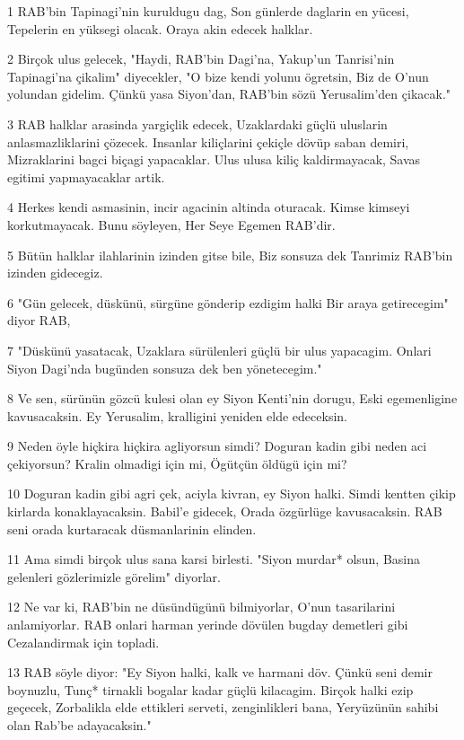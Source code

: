 \par 1 RAB'bin Tapinagi'nin kuruldugu dag, Son günlerde daglarin en yücesi, Tepelerin en yüksegi olacak. Oraya akin edecek halklar.
\par 2 Birçok ulus gelecek, "Haydi, RAB'bin Dagi'na, Yakup'un Tanrisi'nin Tapinagi'na çikalim" diyecekler, "O bize kendi yolunu ögretsin, Biz de O'nun yolundan gidelim. Çünkü yasa Siyon'dan, RAB'bin sözü Yerusalim'den çikacak."
\par 3 RAB halklar arasinda yargiçlik edecek, Uzaklardaki güçlü uluslarin anlasmazliklarini çözecek. Insanlar kiliçlarini çekiçle dövüp saban demiri, Mizraklarini bagci biçagi yapacaklar. Ulus ulusa kiliç kaldirmayacak, Savas egitimi yapmayacaklar artik.
\par 4 Herkes kendi asmasinin, incir agacinin altinda oturacak. Kimse kimseyi korkutmayacak. Bunu söyleyen, Her Seye Egemen RAB'dir.
\par 5 Bütün halklar ilahlarinin izinden gitse bile, Biz sonsuza dek Tanrimiz RAB'bin izinden gidecegiz.
\par 6 "Gün gelecek, düskünü, sürgüne gönderip ezdigim halki Bir araya getirecegim" diyor RAB,
\par 7 "Düskünü yasatacak, Uzaklara sürülenleri güçlü bir ulus yapacagim. Onlari Siyon Dagi'nda bugünden sonsuza dek ben yönetecegim."
\par 8 Ve sen, sürünün gözcü kulesi olan ey Siyon Kenti'nin dorugu, Eski egemenligine kavusacaksin. Ey Yerusalim, kralligini yeniden elde edeceksin.
\par 9 Neden öyle hiçkira hiçkira agliyorsun simdi? Doguran kadin gibi neden aci çekiyorsun? Kralin olmadigi için mi, Ögütçün öldügü için mi?
\par 10 Doguran kadin gibi agri çek, aciyla kivran, ey Siyon halki. Simdi kentten çikip kirlarda konaklayacaksin. Babil'e gidecek, Orada özgürlüge kavusacaksin. RAB seni orada kurtaracak düsmanlarinin elinden.
\par 11 Ama simdi birçok ulus sana karsi birlesti. "Siyon murdar* olsun, Basina gelenleri gözlerimizle görelim" diyorlar.
\par 12 Ne var ki, RAB'bin ne düsündügünü bilmiyorlar, O'nun tasarilarini anlamiyorlar. RAB onlari harman yerinde dövülen bugday demetleri gibi Cezalandirmak için topladi.
\par 13 RAB söyle diyor: "Ey Siyon halki, kalk ve harmani döv. Çünkü seni demir boynuzlu, Tunç* tirnakli bogalar kadar güçlü kilacagim. Birçok halki ezip geçecek, Zorbalikla elde ettikleri serveti, zenginlikleri bana, Yeryüzünün sahibi olan Rab'be adayacaksin."

